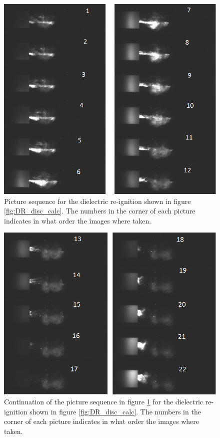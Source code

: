 \documentclass[10pt,b5paper,twoside]{article}
\begin{document}
\begin{figure}[H]
\centering
\includegraphics[scale=0.7, angle =0 ]{Bilder/Results/305_75_DR_TR.png}
\caption{Picture sequence for the dielectric re-ignition shown in figure \ref{fig:DR_disc_calc}. The numbers in the corner of each picture indicates in what order the images where taken.} \label{fig:DR_TR_305_1}
\end{figure}

\begin{figure}[H]
\centering
\includegraphics[scale=0.7, angle =0 ]{Bilder/Results/305_75_DR_TR_2.png}
\caption{Continuation of the picture sequence in figure \ref{fig:DR_TR_305_1} for the dielectric re-ignition shown in figure \ref{fig:DR_disc_calc}. The numbers in the corner of each picture indicates in what order the images where taken.} \label{fig:DR_TR_305_2}
\end{figure}
\end{document}
